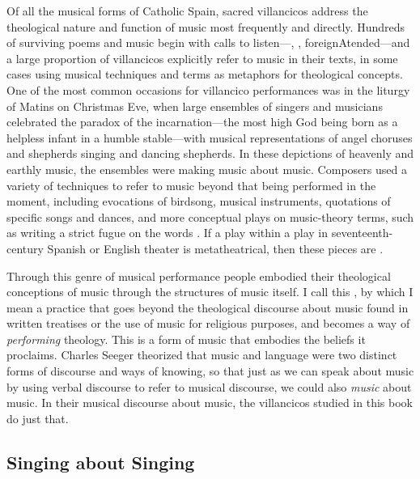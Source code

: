 Of all the musical forms of Catholic Spain, sacred villancicos address the
theological nature and function of music most frequently and directly.
Hundreds of surviving poems and music begin with calls to
listen---, , foreign{Atended}---and a large
proportion of villancicos explicitly refer to music in their texts, in some
cases using musical techniques and terms as metaphors for theological concepts.
One of the most common occasions for villancico performances was in the liturgy
of Matins on Christmas Eve, when large ensembles of singers and musicians
celebrated the paradox of the incarnation---the most high God being born
as a helpless infant in a humble stable---with musical representations of
angel choruses and shepherds singing and dancing shepherds.
In these depictions of heavenly and earthly music, the ensembles were making
music about music.
Composers used a variety of techniques to refer to music beyond that being
performed in the moment, including evocations of birdsong, musical instruments,
quotations of specific songs and dances, and more conceptual plays on
music-theory terms, such as writing a strict fugue on the words
.
If a play within a play in seventeenth-century Spanish or English theater is
metatheatrical, then these pieces are .

Through this genre of musical performance people embodied their theological
conceptions of music through the structures of music itself.
I call this , by which I mean a practice that goes
beyond the theological discourse about music found in written treatises or the
use of music for religious purposes, and becomes a way of \emph{performing}
theology.
This is a form of music that embodies the beliefs it proclaims.
Charles Seeger theorized that music and language were two distinct forms of
discourse and ways of knowing, so that just as we can speak about music by
using verbal discourse to refer to musical discourse, we could also
\emph{music} about music.
In their musical discourse about music, the villancicos studied in this book do
just that.

\subsection{Singing about Singing}

